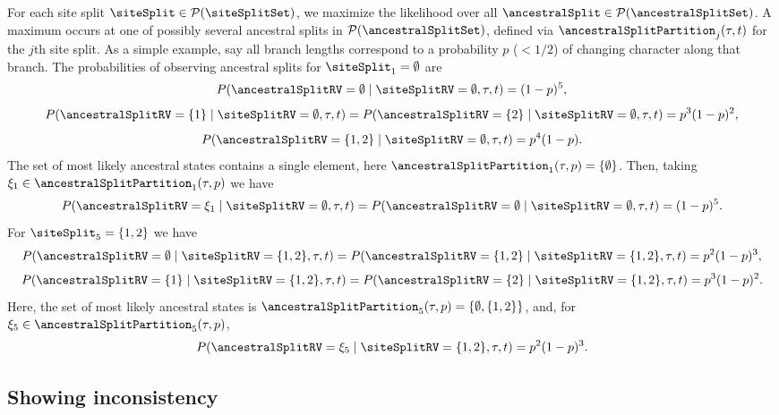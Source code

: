 For each site split $\siteSplit\in\mathcal{P}(\siteSplitSet)$, we maximize the likelihood over all $\ancestralSplit\in\mathcal{P}(\ancestralSplitSet)$.
A maximum occurs at one of possibly several ancestral splits in $\mathcal{P}(\ancestralSplitSet)$, defined via $\ancestralSplitPartition_j(\tau, t)$ for the $j$th site split.
As a simple example, say all branch lengths correspond to a probability $p$ ($< 1/2$) of changing character along that branch.
The probabilities of observing ancestral splits for $\siteSplit_1=\emptyset$ are
$$
P(\ancestralSplitRV=\emptyset \mid \siteSplitRV=\emptyset, \tau, t) =
(1-p)^5,
$$
$$
P(\ancestralSplitRV=\{1\} \mid \siteSplitRV=\emptyset, \tau, t) =
P(\ancestralSplitRV=\{2\} \mid \siteSplitRV=\emptyset, \tau, t) =
p^3(1-p)^2,
$$
$$
P(\ancestralSplitRV=\{1,2\} \mid \siteSplitRV=\emptyset, \tau, t) =
p^4(1-p).
$$
The set of most likely ancestral states contains a single element, here $\ancestralSplitPartition_1(\tau, p)=\{\emptyset\}$.
Then, taking $\xi_1\in\ancestralSplitPartition_1(\tau, p)$ we have
$$
P(\ancestralSplitRV=\xi_1 \mid \siteSplitRV=\emptyset, \tau, t) =
P(\ancestralSplitRV=\emptyset \mid \siteSplitRV=\emptyset, \tau, t) =
(1-p)^5.
$$
For $\siteSplit_5=\{1,2\}$ we have
$$
P(\ancestralSplitRV=\emptyset \mid \siteSplitRV=\{1,2\}, \tau, t) =
P(\ancestralSplitRV=\{1,2\} \mid \siteSplitRV=\{1,2\}, \tau, t) =
p^2(1-p)^3,
$$
$$
P(\ancestralSplitRV=\{1\} \mid \siteSplitRV=\{1,2\}, \tau, t) =
P(\ancestralSplitRV=\{2\} \mid \siteSplitRV=\{1,2\}, \tau, t) =
p^3(1-p)^2.
$$
Here, the set of most likely ancestral states is $\ancestralSplitPartition_5(\tau, p)=\{\emptyset,\{1,2\}\}$, and, for $\xi_5\in\ancestralSplitPartition_5(\tau, p)$,
$$
P(\ancestralSplitRV=\xi_5 \mid \siteSplitRV=\{1,2\}, \tau, t) =
p^2(1-p)^3.
$$

\subsection{Showing inconsistency}

